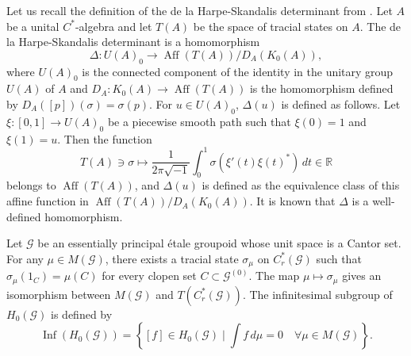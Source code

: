 \documentclass[11pt]{article}
\theoremstyle{definition}
\numberwithin{equation}{section}
\newcommand{\Aff}{\operatorname{Aff}}
\newcommand{\Inf}{\operatorname{Inf}}
\newcommand{\G}{\mathcal{G}}
\newcommand{\R}{\mathbb{R}}
\begin{document}
Let us recall the definition of the de la Harpe-Skandalis determinant 
from \cite{HS84AnnInst}. 
Let $A$ be a unital $C^*$-algebra and 
let $T(A)$ be the space of tracial states on $A$. 
The de la Harpe-Skandalis determinant is a homomorphism 
\[
\Delta:U(A)_0\to\Aff(T(A))/D_A(K_0(A)), 
\]
where $U(A)_0$ is the connected component of the identity 
in the unitary group $U(A)$ of $A$ and 
$D_A:K_0(A)\to\Aff(T(A))$ is the homomorphism defined by 
$D_A([p])(\sigma)=\sigma(p)$. 
For $u\in U(A)_0$, $\Delta(u)$ is defined as follows. 
Let $\xi:[0,1]\to U(A)_0$ be a piecewise smooth path 
such that $\xi(0)=1$ and $\xi(1)=u$. 
Then the function 
\[
T(A)\ni\sigma\mapsto
\frac{1}{2\pi\sqrt{-1}}\int_0^1\sigma(\xi'(t)\xi(t)^*)\,dt\in\R
\]
belongs to $\Aff(T(A))$, 
and $\Delta(u)$ is defined as the equivalence class of 
this affine function in $\Aff(T(A))/D_A(K_0(A))$. 
It is known that $\Delta$ is a well-defined homomorphism. 

Let $\G$ be an essentially principal \'etale groupoid 
whose unit space is a Cantor set. 
For any $\mu\in M(\G)$, 
there exists a tracial state $\sigma_\mu$ on $C^*_r(\G)$ 
such that $\sigma_\mu(1_C)=\mu(C)$ for every clopen set $C\subset\G^{(0)}$. 
The map $\mu\mapsto\sigma_\mu$ gives an isomorphism 
between $M(\G)$ and $T(C^*_r(\G))$. 
The infinitesimal subgroup of $H_0(\G)$ is defined by 
\[
\Inf(H_0(\G))
=\left\{[f]\in H_0(\G)\mid\int f\,d\mu=0\quad\forall\mu\in M(\G)\right\}. 
\]
\end{document}
